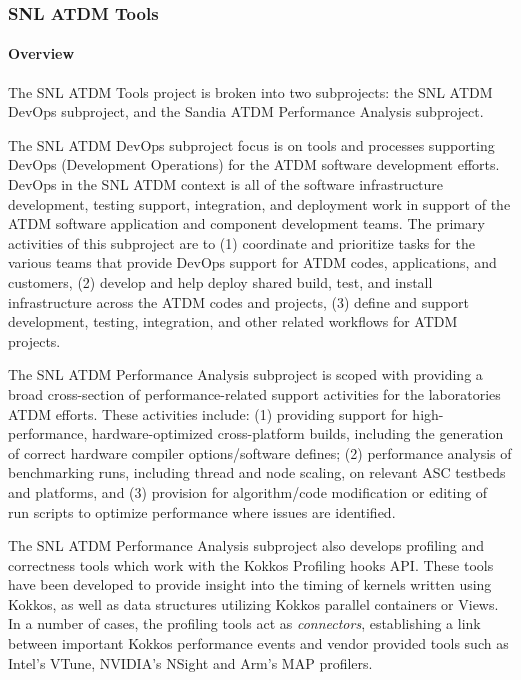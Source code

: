 \subsubsection{ SNL ATDM Tools} 

\paragraph{Overview}

The SNL ATDM Tools project is broken into two subprojects: the SNL ATDM DevOps subproject, and the Sandia ATDM Performance Analysis subproject.

The SNL ATDM DevOps subproject focus is on tools and processes supporting DevOps (Development Operations) for the ATDM software development efforts.
DevOps in the SNL ATDM context is all of the software infrastructure development, testing support, integration, and deployment work in support of the ATDM software application and component development teams.
The primary activities of this subproject are to (1) coordinate and prioritize tasks for the various teams that provide DevOps support for ATDM codes, applications, and customers, (2) develop and help deploy shared build, test, and install infrastructure across the ATDM codes and projects, (3) define and support development, testing, integration, and other related workflows for ATDM projects.

The SNL ATDM Performance Analysis subproject is scoped with providing a broad cross-section of performance-related support activities for the laboratories ATDM efforts.
These activities include: (1) providing support for high-performance, hardware-optimized cross-platform builds, including the generation of correct hardware compiler options/software defines; (2) performance
analysis of benchmarking runs, including thread and node scaling, on relevant ASC testbeds and platforms, and (3) provision for algorithm/code modification or editing of run scripts to optimize performance where issues are identified.

The SNL ATDM Performance Analysis subproject also develops profiling and correctness tools which work with the Kokkos Profiling hooks API.
These tools have been developed to provide insight into the timing of kernels written using Kokkos, as well as data structures utilizing Kokkos parallel containers or Views.
In a number of cases, the profiling tools act as {\em connectors}, establishing a link between important Kokkos performance events and vendor provided tools such as Intel's VTune, NVIDIA's NSight and Arm's MAP profilers.


